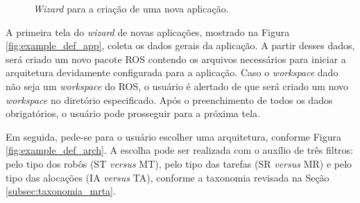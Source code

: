 \begin{figure}[htb]
                \caption{\textit{Wizard} para a criação de uma nova aplicação.} \label{fig:example_new_app}
            \end{figure}
            
            A primeira tela do \textit{wizard} de novas aplicações, mostrado na Figura \ref{fig:example_def_app}, coleta os dados gerais da aplicação. A partir desses dados, será criado um novo pacote ROS contendo os arquivos necessários para iniciar a arquitetura devidamente configurada para a aplicação. Caso o \textit{workspace} dado não seja um \textit{workspace} do ROS, o usuário é alertado de que será criado um novo \textit{workspace} no diretório especificado. Após o preenchimento de todos os dados obrigatórios, o usuário pode prosseguir para a próxima tela.
            
            Em seguida, pede-se para o usuário escolher uma arquitetura, conforme Figura \ref{fig:example_def_arch}. A escolha pode ser realizada com o auxílio de três filtros: pelo tipo dos robôs (ST \textit{versus} MT), pelo tipo das tarefas (SR \textit{versus} MR) e pelo tipo das alocações (IA \textit{versus} TA), conforme a taxonomia revisada na Seção \ref{subsec:taxonomia_mrta}.
            
